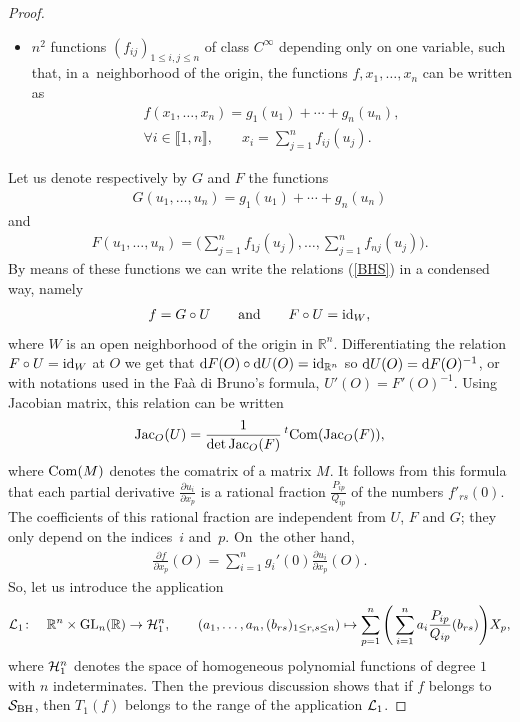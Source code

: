 \documentclass[10pt,a4paper]{amsart}
\numberwithin{equation}{section}
\begin{document}
\begin{proof}
\begin{itemize}
\item $n^2$ functions $(f_{ij})_{1\leq i, j\leq n}$ of class $C^\infty$ depending only on one variable, such that, in a~neighborhood of the origin, the functions $f,x_1,\dots,x_n$ can be written as
	\begin{gather}
	f(x_1, \dots, x_n)=g_1(u_1)+\cdots+g_n(u_n),\nonumber
\\
\forall i\in\llbracket 1,n\rrbracket,\qquad x_i=\sum_{j=1}^nf_{ij}(u_j).\label{BHS}
	\end{gather}
\end{itemize}
	Let us denote respectively by $G$ and $F$ the functions
\begin{gather*}
G(u_1,\dots, u_n)=g_1(u_1)+\cdots+g_n(u_n)
\end{gather*}
and
\begin{gather*}
F(u_1,\dots, u_n)=\Bigg(\sum_{j=1}^nf_{1j}(u_j),\dots,\sum_{j=1}^nf_{nj}(u_j)\Bigg).
\end{gather*}
	By means of these functions we can write the relations (\ref{BHS}) in a condensed way, namely
\begin{gather*}
f=G\circ U\qquad \text{and}\qquad F\circ U={\rm id}_{W},
\end{gather*}
	where $W$ is an open neighborhood of the origin in $\mathbb{R}^n$.
	Differentiating the relation $F\circ U={\rm id}_{W}$ at $O$ we get that ${\rm d}F(O)\circ {\rm d}U(O)={\rm id}_{\mathbb{R}^n}$ so ${\rm d}U(O)={\rm d}F(O)^{-1}$, or with notations used in the Fa\`a di Bruno's formula, $U'(O)=F'(O)^{-1}$. Using Jacobian matrix, this relation can be written
\begin{gather*}
{\rm Jac}_O(U)=\frac{1}{\det{\rm Jac}_O(F)} \,{}^t{\rm Com}({\rm Jac}_O(F)),
\end{gather*}
	where ${\rm Com}(M)$ denotes the comatrix of a matrix $M$. It follows from this formula that each partial derivative $\frac{\partial u_i}{\partial x_p}$ is a rational fraction $\frac{P_{ip}}{Q_{ip}}$ of the numbers $f'_{rs}(0)$. The coefficients of this rational fraction are independent from $U$, $F$ and $G$; they only depend on the indices~$i$ and~$p$.
	On~the other hand,
\begin{gather*}
\frac{\partial f}{\partial x_p}(O)=\sum_{i=1}^ng_i'(0)\frac{\partial u_i}{\partial x_p}(O).
\end{gather*}
	So, let us introduce the application
\begin{gather*}
{\cal L}_1\colon\quad \mathbb{R}^n\times {\rm GL}_n(\mathbb{R})\to{\cal H}_1^n,\qquad
	(a_1,\dots,a_n,(b_{rs})_{1\leq r,s\leq n})\mapsto\sum_{p=1}^n\Bigg(\sum_{i=1}^n a_i\frac{P_{ip}}{Q_{ip}}(b_{rs}) \Bigg)X_p,
\end{gather*}
	where ${\cal H}_1^n$ denotes the space of homogeneous polynomial functions of degree $1$ with $n$ indeterminates. Then the previous discussion shows that if $f$ belongs to ${\cal S}_{\rm BH}$, then $T_1(f)$ belongs to the range of the application ${\cal L}_1$.
	

\end{proof}
\end{document}
